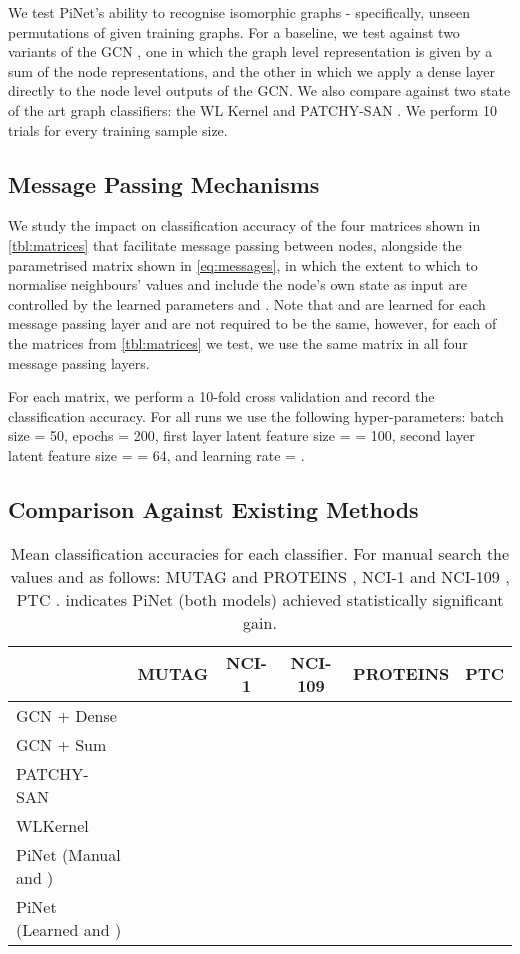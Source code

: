 \documentclass{article}
\theoremstyle{definition}
\begin{document}
We test PiNet's ability to recognise isomorphic graphs - specifically, unseen permutations of given training graphs. For a baseline, we test against two variants of the GCN \cite{Kipf2016}, one in which the graph level representation is given by a sum of the node representations, and the other in which we apply a dense layer directly to the node level outputs of the GCN. We also compare against two state of the art graph classifiers: the WL Kernel \cite{ShervashidzeNINOSHERVASHIDZE2011} and PATCHY-SAN \cite{Niepert2016}. We perform 10 trials for every training sample size.

\subsection{Message Passing Mechanisms}
\label{exp:message}

We study the impact on classification accuracy of the four matrices shown in \autoref{tbl:matrices} that facilitate message passing between nodes, alongside the parametrised matrix shown in \autoref{eq:messages}, in which the extent to which to normalise neighbours' values and include the node's own state as input are controlled by the learned parameters  and . Note that  and  are learned for each message passing layer and are not required to be the same, however, for each of the matrices from \autoref{tbl:matrices} we test, we use the same matrix in all four message passing layers.

For each matrix, we perform a 10-fold cross validation and record the classification accuracy. For all runs we use the following hyper-parameters: batch size = 50, epochs = 200, first layer latent feature size \small\normalsize = \small\normalsize = 100, second layer latent feature size \small\normalsize = \small\normalsize = 64, and learning rate = .

\subsection{Comparison Against Existing Methods}

\begin{table*}[b]
  \small
  \centering
\begin{tabular}{lccccc}
\toprule
 &            MUTAG &            NCI-1 &          NCI-109 &         PROTEINS &              PTC \\
\midrule
GCN + Dense &   &   &   &   &   \\
GCN + Sum &   &   &   &   &   \\
PATCHY-SAN &  &  &  &  &  \\
WLKernel   &   &   &   &   &   \\
\midrule
PiNet (Manual  and ) &   &   &   &   &   \\
PiNet (Learned  and ) &   &   &   &   &   \\
\bottomrule
\end{tabular}
\caption{Mean classification accuracies for each classifier. For manual search the values  and  as follows: MUTAG and PROTEINS , NCI-1 and NCI-109 , PTC .  indicates PiNet (both models) achieved statistically significant gain.}
\label{tbl:benchresults}
\end{table*}
\end{document}

